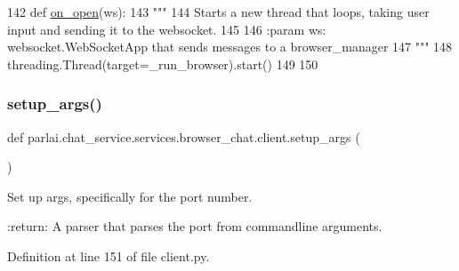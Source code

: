 \begin{DoxyCode}
142 \textcolor{keyword}{def }\hyperlink{namespaceparlai_1_1chat__service_1_1services_1_1terminal__chat_1_1client_a9186bee0436623cc10a378752ba8a61c}{on\_open}(ws):
143     \textcolor{stringliteral}{"""}
144 \textcolor{stringliteral}{    Starts a new thread that loops, taking user input and sending it to the websocket.}
145 \textcolor{stringliteral}{}
146 \textcolor{stringliteral}{    :param ws: websocket.WebSocketApp that sends messages to a browser\_manager}
147 \textcolor{stringliteral}{    """}
148     threading.Thread(target=\_run\_browser).start()
149 
150 
\end{DoxyCode}
\mbox{\label{namespaceparlai_1_1chat__service_1_1services_1_1browser__chat_1_1client_a20c9862417d1f1a61b06551de0820ee4}} 
\subsubsection{\texorpdfstring{setup\+\_\+args()}{setup\_args()}}
{\footnotesize\ttfamily def parlai.\+chat\+\_\+service.\+services.\+browser\+\_\+chat.\+client.\+setup\+\_\+args (\begin{DoxyParamCaption}{ }\end{DoxyParamCaption})}

\begin{DoxyVerb}Set up args, specifically for the port number.

:return: A parser that parses the port from commandline arguments.
\end{DoxyVerb}
 

Definition at line 151 of file client.\+py.


